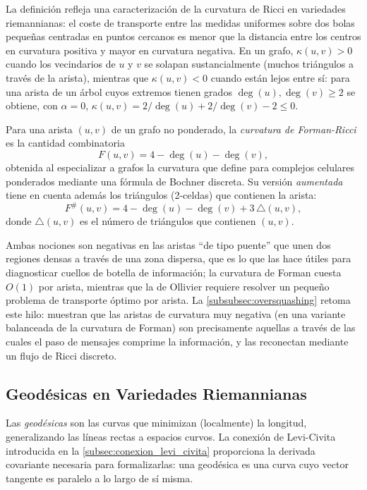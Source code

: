 La definición refleja una caracterización de la curvatura de Ricci en variedades riemannianas: el coste de transporte entre las medidas uniformes sobre dos bolas pequeñas centradas en puntos cercanos es menor que la distancia entre los centros en curvatura positiva y mayor en curvatura negativa. En un grafo, $\kappa(u,v) > 0$ cuando los vecindarios de $u$ y $v$ se solapan sustancialmente (muchos triángulos a través de la arista), mientras que $\kappa(u,v) < 0$ cuando están lejos entre sí: para una arista de un árbol cuyos extremos tienen grados $\deg(u), \deg(v) \geq 2$ se obtiene, con $\alpha = 0$, $\kappa(u,v) = 2/\deg(u) + 2/\deg(v) - 2 \leq 0$.

\begin{definition}\label{def:curvatura_forman}
Para una arista $(u,v)$ de un grafo no ponderado, la \textit{curvatura de Forman-Ricci} es la cantidad combinatoria
\[
F(u,v) = 4 - \deg(u) - \deg(v),
\]
obtenida al especializar a grafos la curvatura que \citet{forman2003bochner} define para complejos celulares ponderados mediante una fórmula de Bochner discreta. Su versión \textit{aumentada} tiene en cuenta además los triángulos (2-celdas) que contienen la arista:
\[
F^{\#}(u,v) = 4 - \deg(u) - \deg(v) + 3\,\triangle(u,v),
\]
donde $\triangle(u,v)$ es el número de triángulos que contienen $(u,v)$.
\end{definition}

Ambas nociones son negativas en las aristas ``de tipo puente'' que unen dos regiones densas a través de una zona dispersa, que es lo que las hace útiles para diagnosticar cuellos de botella de información; la curvatura de Forman cuesta $O(1)$ por arista, mientras que la de Ollivier requiere resolver un pequeño problema de transporte óptimo por arista. La \autoref{subsubsec:oversquashing} retoma este hilo: \citet{topping2022understanding} muestran que las aristas de curvatura muy negativa (en una variante balanceada de la curvatura de Forman) son precisamente aquellas a través de las cuales el paso de mensajes comprime la información, y las reconectan mediante un flujo de Ricci discreto.

\subsection{Geodésicas en Variedades Riemannianas}\label{subsec:geodesicas_variedades}

Las \textit{geodésicas} son las curvas que minimizan (localmente) la longitud, generalizando las líneas rectas a espacios curvos. La conexión de Levi-Civita introducida en la \autoref{subsec:conexion_levi_civita} proporciona la derivada covariante necesaria para formalizarlas: una geodésica es una curva cuyo vector tangente es paralelo a lo largo de sí misma.

